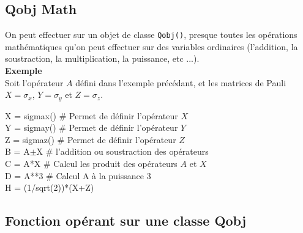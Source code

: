 \subsection{Qobj Math}

On peut effectuer sur un objet de classe \texttt{Qobj()}, presque toutes les opérations mathématiques qu'on peut effectuer sur des variables ordinaires (l'addition, la soustraction, la multiplication, la puissance, etc ...).\\
\textbf{Exemple}\\
Soit l'opérateur $A$ défini dans l'exemple précédant, et les matrices de Pauli $X = \sigma_x$, $Y=\sigma_y$ et $Z = \sigma_z$.\\
\begin{tt}
X = sigmax() \# Permet de définir l'opérateur $X$\\
Y = sigmay() \# Permet de définir l'opérateur $Y$\\
Z = sigmaz() \# Permet de définir l'opérateur $Z$\\
B = A$\pm$X \# l'addition ou soustraction des opérateurs\\
C = A*X \# Calcul les produit des opérateurs $A$ et $X$\\
D = A**3 \# Calcul A à la puissance 3\\
H = (1/sqrt(2))*(X+Z) \\
\end{tt}

\subsection{Fonction opérant sur une classe Qobj}

